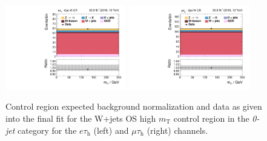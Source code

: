 
\begin{figure}[h!]
   \centering
  \includegraphics[width=0.47\textwidth]{Figures/background_estimation/qcd_et_control-regions/htt_inputet10__htt_et_10_13TeV.pdf}
  \includegraphics[width=0.47\textwidth]{Figures/background_estimation/qcd_mt_control-regions/htt_inputmt10__htt_mt_10_13TeV.pdf}
 \caption[\textit{0-jet} opposite-sign \textit{W+jets} control regions.]{Control region expected background normalization and data as given into the final fit for the W+jets OS high $m_\text{T}$ control region in the \textit{0-jet} category for the $e\tau_\text{h}$ (left) and $\mu\tau_\text{h}$ (right) channels.}\label{fig:etmtqcd:0jet_w_control}
\end{figure}

